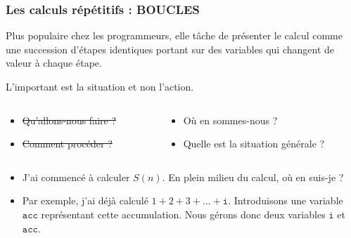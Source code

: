\documentclass[10pt]{beamer}
\begin{document}
\begin{frame}
  \frametitle{ Les calculs répétitifs : BOUCLES}
  Plus populaire chez les programmeurs, elle tâche de présenter le calcul comme une succession d'étapes identiques portant sur des variables qui changent de valeur à chaque étape.

  \begin{alertblock}{L'important est la situation et non l'action.}
    
\begin{columns}[t]
\begin{column}{0.43\textwidth}
  \begin{itemize}
  \item \sout{Qu'allons-nous faire ?}
  \item \sout{Comment procéder ?}
  \end{itemize}
\end{column}
\begin{column}{0.57\textwidth}
  \begin{itemize}
  \item Où en sommes-nous ?
  \item Quelle est la situation générale ?
  \end{itemize}
\end{column}
\end{columns}

  \end{alertblock}

  \begin{itemize}
\item J'ai commencé à calculer $S(n)$. En plein milieu du calcul, où en suis-je ?
\item Par exemple, j'ai déjà calculé $1 + 2 + 3 + \ldots + \mathtt{i}$.
Introduisons une variable $\mathtt{acc}$ représentant cette accumulation.
Nous gérons donc deux variables $\mathtt{i}$ et $\mathtt{acc}$.
\end{itemize}

\end{frame}
\end{document}
